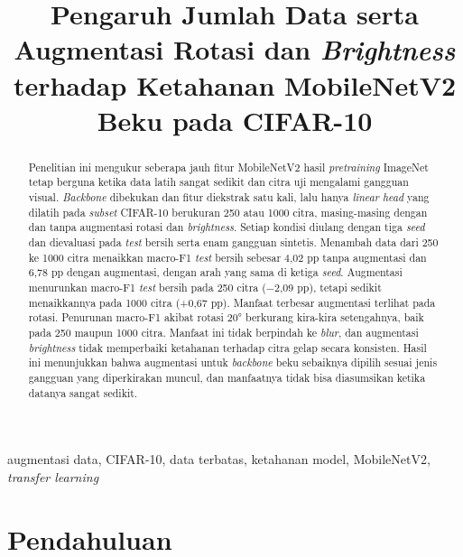 \documentclass[conference]{IEEEtran}
\begin{document}
\title{Pengaruh Jumlah Data serta Augmentasi Rotasi dan \emph{Brightness} terhadap Ketahanan MobileNetV2 Beku pada CIFAR-10}

\author{
}

\maketitle

\begin{abstract}
Penelitian ini mengukur seberapa jauh fitur MobileNetV2 hasil \emph{pretraining} ImageNet tetap berguna ketika data latih sangat sedikit dan citra uji mengalami gangguan visual. \emph{Backbone} dibekukan dan fitur diekstrak satu kali, lalu hanya \emph{linear head} yang dilatih pada \emph{subset} CIFAR-10 berukuran 250 atau 1000 citra, masing-masing dengan dan tanpa augmentasi rotasi dan \emph{brightness}. Setiap kondisi diulang dengan tiga \emph{seed} dan dievaluasi pada \emph{test} bersih serta enam gangguan sintetis. Menambah data dari 250 ke 1000 citra menaikkan macro-F1 \emph{test} bersih sebesar 4,02 pp tanpa augmentasi dan 6,78 pp dengan augmentasi, dengan arah yang sama di ketiga \emph{seed}. Augmentasi menurunkan macro-F1 \emph{test} bersih pada 250 citra ($-$2,09 pp), tetapi sedikit menaikkannya pada 1000 citra (+0,67 pp). Manfaat terbesar augmentasi terlihat pada rotasi. Penurunan macro-F1 akibat rotasi 20° berkurang kira-kira setengahnya, baik pada 250 maupun 1000 citra. Manfaat ini tidak berpindah ke \emph{blur}, dan augmentasi \emph{brightness} tidak memperbaiki ketahanan terhadap citra gelap secara konsisten. Hasil ini menunjukkan bahwa augmentasi untuk \emph{backbone} beku sebaiknya dipilih sesuai jenis gangguan yang diperkirakan muncul, dan manfaatnya tidak bisa diasumsikan ketika datanya sangat sedikit.
\end{abstract}

\begin{IEEEkeywords}
augmentasi data, CIFAR-10, data terbatas, ketahanan model, MobileNetV2, \emph{transfer learning}
\end{IEEEkeywords}

\section{Pendahuluan}
\end{document}
